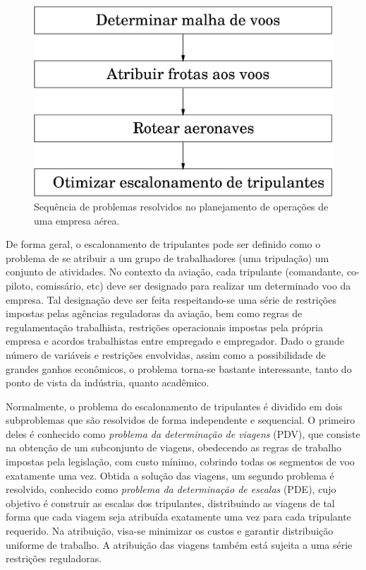 \begin{figure}[htbp]
	\begin{center}
		\includegraphics[scale=0.5]{fig/planejamento.eps}
		\caption{Sequência de problemas resolvidos no planejamento de operações de uma empresa
		aérea.}
		\label{fig:planejamento}
	\end{center}
\end{figure}

De forma geral, o escalonamento de tripulantes pode ser definido como o problema de se atribuir a um
grupo de trabalhadores (uma tripulação) um conjunto de atividades. No contexto da aviação, cada
tripulante (comandante, co-piloto, comissário, etc) deve ser designado para realizar um determinado
voo da empresa. Tal designação deve ser feita respeitando-se uma série de restrições impostas pelas
agências reguladoras da aviação, bem como regras de regulamentação trabalhista, restrições
operacionais impostas pela própria empresa e acordos trabalhistas entre empregado e empregador. Dado
o grande número de variáveis e restrições envolvidas, assim como a possibilidade de grandes ganhos
econômicos, o problema torna-se bastante interessante, tanto do ponto de vista da indústria, quanto
acadêmico.

Normalmente, o problema do escalonamento de tripulantes é dividido em dois subproblemas que são
resolvidos de forma independente e sequencial. O primeiro deles é conhecido como \emph{problema da
determinação de viagens} (PDV), que consiste na obtenção de um subconjunto de viagens, obedecendo as
regras de trabalho impostas pela legislação, com custo mínimo, cobrindo todas os segmentos de voo
exatamente uma vez. Obtida a solução das viagens, um segundo problema é resolvido, conhecido como
\emph{problema da determinação de escalas} (PDE), cujo objetivo é construir as escalas dos
tripulantes, distribuindo as viagens de tal forma que cada viagem seja atribuída exatamente uma vez
para cada tripulante requerido. Na atribuição, visa-se minimizar os custos e garantir distribuição
uniforme de trabalho. A atribuição das viagens também está sujeita a uma série restrições
reguladoras.

